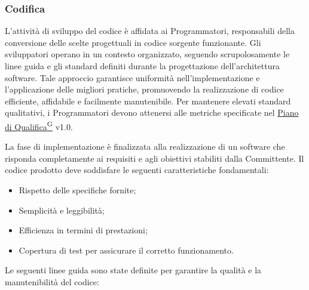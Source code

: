 \subsubsection{Codifica}
L'attività di sviluppo del codice è affidata ai Programmatori, responsabili della conversione delle scelte progettuali in codice sorgente funzionante. Gli sviluppatori operano in un contesto organizzato, seguendo scrupolosamente le linee guida e gli standard definiti durante la progettazione dell'architettura software. Tale approccio garantisce uniformità nell'implementazione e l'applicazione delle migliori pratiche, promuovendo la realizzazione di codice efficiente, affidabile e facilmente manutenibile. 
Per mantenere elevati standard qualitativi, i Programmatori devono attenersi alle metriche specificate nel \href{https://code7crusaders.github.io/docs/PB/documentazione_interna/glossario.html#piano-di-qualifica}{Piano di Qualifica\textsuperscript{G}} v1.0.

La fase di implementazione è finalizzata alla realizzazione di un software che risponda completamente ai requisiti e agli obiettivi stabiliti dalla Committente. Il codice prodotto deve soddisfare le seguenti caratteristiche fondamentali:
\begin{itemize}
    \item Rispetto delle specifiche fornite;
    \item Semplicità e leggibilità;
    \item Efficienza in termini di prestazioni;
    \item Copertura di test per assicurare il corretto funzionamento.
\end{itemize}

Le seguenti linee guida sono state definite per garantire la qualità e la manutenibilità del codice:

